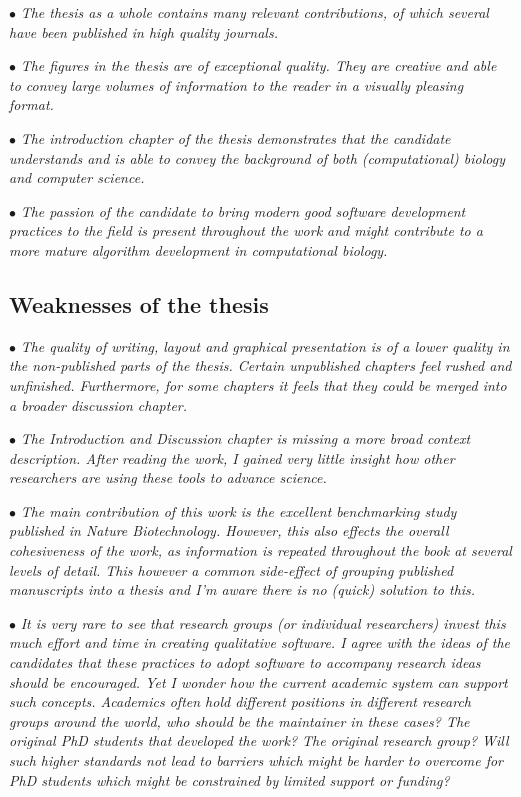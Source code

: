 \documentclass[10pt]{article}
\newcommand{\exam}[2][\  ]{\hspace{0pt}\marginpar{\color{red}#1}$\bullet$ \textit{#2}}
\newcommand{\imp}[1]{{\color{red} #1}}
\newcommand{\nimp}[1]{{\color{gray} #1}}
\newcommand{\bigexclaim}{\raisebox{-0.1em}{\BigTriangleUp}\hspace{-0.32em}\llap{\small\textbf{!}}\hspace{0.32em}}
\newcommand{\tagimp}{\bigexclaim}
\newcommand{\tagtime}{{\Large $\hourglass$}}
\begin{document}
{\exam{\nimp{The thesis as a whole contains many relevant contributions, of which several
	have been published in high quality journals.}}

\exam{\nimp{The figures in the thesis are of exceptional quality. They are creative and able
	to convey large volumes of information to the reader in a visually pleasing
	format.}}

\exam{\nimp{The introduction chapter of the thesis demonstrates that the candidate
	understands and is able to convey the background of both (computational)
	biology and computer science.}}

\exam{\nimp{The passion of the candidate to bring modern good software development
	practices to the field is present throughout the work and might contribute to a
	more mature algorithm development in computational biology.}}



\subsection{Weaknesses of the thesis}
\exam[\tagimp \tagtime]{\imp{The quality of writing, layout and graphical presentation is of a lower quality in the non-published parts of the thesis. Certain unpublished chapters feel rushed and unfinished. Furthermore, for some chapters it feels that they could be merged into a broader discussion chapter.}}

\exam[\tagimp \tagtime]{\imp{The Introduction and Discussion chapter is missing a more broad context
	description. After reading the work, I gained very little insight how other
	researchers are using these tools to advance science.}}


\exam{\nimp{The main contribution of this work is the excellent benchmarking study
	published in Nature Biotechnology.} However, this also effects the overall
	cohesiveness of the work, as information is repeated throughout the book at
	several levels of detail. \nimp{This however a common side-effect of grouping
	published manuscripts into a thesis and I’m aware there is no (quick) solution
	to this.}}

\exam[\tagimp]{\nimp{It is very rare to see that research groups (or individual researchers) invest this
	much effort and time in creating qualitative software. I agree with the ideas of
	the candidates that these practices to adopt software to accompany research
	ideas should be encouraged.} Yet I wonder how the current academic system
	can support such concepts. Academics often hold different positions in
	different research groups around the world, who should be the maintainer in
	these cases? The original PhD students that developed the work? The original
	research group? Will such higher standards not lead to barriers which might
	be harder to overcome for PhD students which might be constrained by limited
	support or funding?}


}
\end{document}
